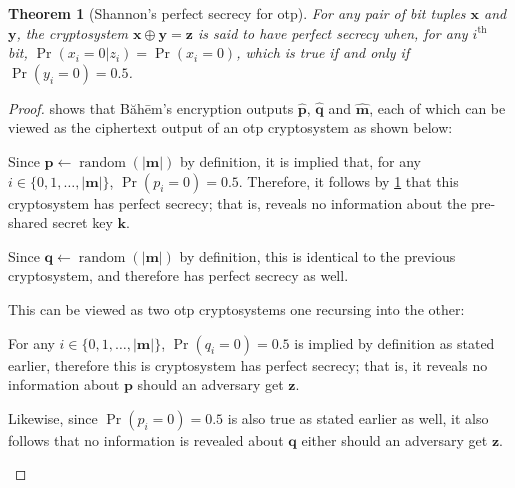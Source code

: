 \documentclass[twocolumn]{article}
\newcommand{\baheem}{Băhēm}
\DeclareMathOperator{\random}{random}
\newtheorem{theorem}{Theorem}[section]
\begin{document}
\begin{theorem}[Shannon's perfect secrecy for \gls{otp}]
    For any pair of bit tuples $\mathbf{x}$ and $\mathbf{y}$, the cryptosystem
    $\mathbf{x} \oplus \mathbf{y} = \mathbf{z}$ is said to have \emph{perfect
    secrecy} when, for any $i^{\text{th}}$ bit, $\Pr(x_i=0 | z_i) =\Pr(x_i=0)$,
    which is true if and only if $\Pr(y_i=0) = 0.5$.
    \label{thrm_otp_perfect_secrecy}
\end{theorem}

\begin{proof}
 shows that \baheem's encryption outputs
    $\mathbf{\hat p}$, $\mathbf{\hat q}$ and $\mathbf{\hat m}$, each of
    which can be viewed as the ciphertext output of an \gls{otp}
    cryptosystem as shown below:
\begin{description}[itemsep=0em]
    \item[$\mathbf{k} \oplus \mathbf{p} = \mathbf{\hat p}$.] Since
        $\mathbf{p} \gets \random(|\mathbf{m}|)$ by definition, it is
        implied that, for any $i \in \{0, 1, \ldots, |\mathbf{m}|\}$,
        $\Pr(p_i=0) = 0.5$. Therefore, it follows by
        \cref{thrm_otp_perfect_secrecy} that this cryptosystem has perfect
        secrecy; that is, reveals no information about the pre-shared
        secret key $\mathbf{k}$.

    \item[$\mathbf{k} \oplus \mathbf{q} = \mathbf{\hat q}$.] Since
        $\mathbf{q} \gets \random(|\mathbf{m}|)$ by definition, this is
        identical to the previous cryptosystem, and therefore has perfect
        secrecy as well.

    \item[$\mathbf{p} \oplus \mathbf{q} \oplus \mathbf{m} = \mathbf{\hat
        m}$.] This can be viewed as two \gls{otp} cryptosystems one
        recursing into the other:
        \begin{description}[itemsep=0em]
            \item[$\mathbf{p} \oplus \mathbf{q} = \mathbf{z}$.]  For any $i
                \in \{0, 1, \ldots, |\mathbf{m}|\}$, $\Pr(q_i=0) = 0.5$ is
                implied by definition as stated earlier, therefore this is
                cryptosystem has perfect secrecy; that is, it reveals no
                information about $\mathbf{p}$ should an adversary get
                $\mathbf{z}$.

                Likewise, since $\Pr(p_i=0) = 0.5$ is also true as stated
                earlier as well, it also follows that no information is
                revealed about $\mathbf{q}$ either should an adversary get
                $\mathbf{z}$.


\end{description}
\end{description}
\end{proof}
\end{document}
